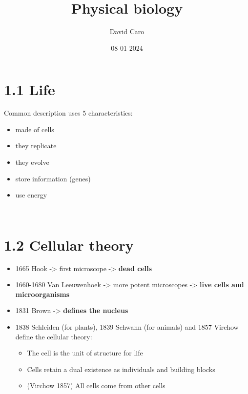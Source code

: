 \documentclass[a4paper,landscape,10pt]{cheatsheet}
\title{Physical biology}
\author{David Caro}
\date{08-01-2024}
\begin{document}
\maketitle

\section{1.1 Life}
Common description uses 5 characteristics:
\begin{itemize}
      \item made of cells
      \item they replicate
      \item they evolve
      \item store information (genes)
      \item use energy
\end{itemize}

\hfill\\
\section{1.2 Cellular theory}
\begin{itemize}
      \item 1665 Hook -> first microscope -> \textbf{dead cells}\\
      \item 1660-1680 Van Leeuwenhoek -> more potent microscopes -> \textbf{live cells and microorganisms}\\
      \item 1831 Brown -> \textbf{defines the nucleus}\\
      \item 1838 Schleiden (for plants), 1839 Schwann (for animals) and 1857 Virchow define the cellular theory:
            \begin{itemize}
                  \item The cell is the unit of structure for life
                  \item Cells retain a dual existence as individuals and building blocks
                  \item (Virchow 1857) All cells come from other cells
            \end{itemize}
\end{itemize}

\hfill\\
\end{document}
